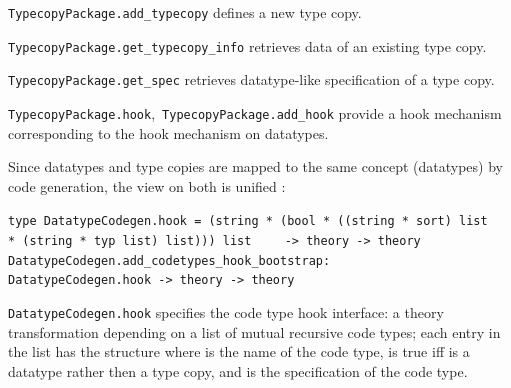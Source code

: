 \begin{isabellebody}
\begin{isamarkuptext}
\begin{description}
  \item \verb|TypecopyPackage.add_typecopy| defines a new
     type copy.

  \item \verb|TypecopyPackage.get_typecopy_info| retrieves
     data of an existing type copy.

  \item \verb|TypecopyPackage.get_spec| retrieves datatype-like
     specification of a type copy.

  \item \verb|TypecopyPackage.hook|,~\verb|TypecopyPackage.add_hook|
     provide a hook mechanism corresponding to the hook mechanism
     on datatypes.

  \end{description}%
\end{isamarkuptext}%
\isamarkuptrue%
%
\endisatagmlref
{\isafoldmlref}%
%
\isadelimmlref
%
\endisadelimmlref
%
\isamarkuptrue%
%
\begin{isamarkuptext}%
Since datatypes and type copies are mapped to the same concept (datatypes)
  by code generation, the view on both is unified :%
\end{isamarkuptext}%
\isamarkuptrue%
%
\isadelimmlref
%
\endisadelimmlref
%
\isatagmlref
%
\begin{isamarkuptext}%
\begin{mldecls}
  \verb|type DatatypeCodegen.hook = (string * (bool * ((string * sort) list|\isasep\isanewline%
\verb|    * (string * typ list) list))) list|\isasep\isanewline%
\verb|    -> theory -> theory| \\
  \verb|DatatypeCodegen.add_codetypes_hook_bootstrap: |\isasep\isanewline%
\verb|      DatatypeCodegen.hook -> theory -> theory|
  \end{mldecls}%
\end{isamarkuptext}%
\isamarkuptrue%
%
\endisatagmlref
{\isafoldmlref}%
%
\isadelimmlref
%
\endisadelimmlref
%
\begin{isamarkuptext}%
\begin{description}

  \item \verb|DatatypeCodegen.hook| specifies the code type hook
     interface: a theory transformation depending on a list of
     mutual recursive code types; each entry in the list
     has the structure 
     where  is the name of the code type, 
     is true iff  is a datatype rather then a type copy,
     and  is the specification of the code type.


\end{description}
\end{isamarkuptext}
\end{isabellebody}
